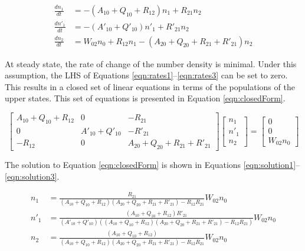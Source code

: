 \begin{align}
\frac{dn_1}{dt} &= -( A_{10} + Q_{10} + R_{12} )n_1 + R_{21}n_2
\label{eqn:rates1}\\
\frac{dn'_1}{dt} &= -( A'_{10} + Q'_{10} )n'_1 + R'_{21}n_2
\label{eqn:rates2}\\
\frac{dn_2}{dt} &= W_{02}n_0 + R_{12}n_1 - ( A_{20} + Q_{20} + R_{21} + R'_{21} )n_2
\label{eqn:rates3}
\end{align}

At steady state, the rate of change of the number density is minimal.
Under this assumption, the LHS of Equations \ref{eqn:rates1}--\ref{eqn:rates3} can be set to zero.
This results in a closed set of linear equations in terms of the populations of the upper states.
This set of equations is presented in Equation \ref{eqn:closedForm}.

\begin{equation}
  \left[
    \begin{matrix}
      A_{10} + Q_{10} + R_{12} & 0 & -R_{21}\\
      0 & A'_{10} + Q'_{10} & -R'_{21}\\
      -R_{12} & 0 & A_{20} + Q_{20} + R_{21} + R'_{21}
    \end{matrix}
  \right]\left[
    \begin{matrix}
      n_1\\
      n'_1\\
      n_2
    \end{matrix}
  \right] = \left[
    \begin{matrix}
      0\\
      0\\
      W_{02}n_0
    \end{matrix}
  \right]
  \label{eqn:closedForm}
\end{equation}

The solution to Equation \ref{eqn:closedForm} is shown in Equations \ref{eqn:solution1}--\ref{eqn:solution3}.

\begin{align}
  n_1 &= \frac{ R_{21} }{ ( A_{10} + Q_{10} + R_{12} )( A_{20} + Q_{20} + R_{21} + R'_{21} ) - R_{12}R_{21} }W_{02}n_0
  \label{eqn:solution1}\\
  n'_1 &= \frac{ ( A_{10} + Q_{10} + R_{12} )R'_{21} }{ ( A'_{10} + Q'_{10} ) ( ( A_{10} + Q_{10} + R_{12} )( A_{20} + Q_{20} + R_{21} + R'_{21} ) - R_{12}R_{21} ) }W_{02}n_0
  \label{eqn:solution2}\\
  n_2 &= \frac{ ( A_{10} + Q_{10} + R_{12} ) }{ ( A_{10} + Q_{10} + R_{12} )( A_{20} + Q_{20} + R_{21} + R'_{21} ) - R_{12}R_{21} }W_{02}n_0
  \label{eqn:solution3}
\end{align}

